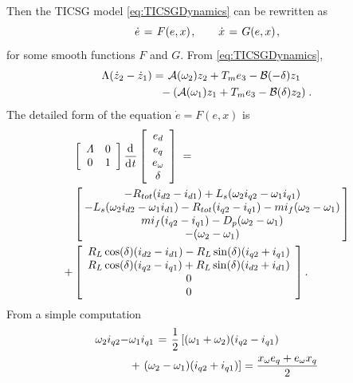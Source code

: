 \documentclass[letterpaper,10pt,conference]{ieeeconf}
\renewcommand{\L}    {{\Lambda}}
\renewcommand{\o}    {{\omega}}
\newcommand{\half}   {{\frac{1}{2}}}
\newcommand{\m}      {{\hbox{\hskip 1pt}}}
\newcommand{\nm}     {{\hbox{\hskip -3pt}}}
\newcommand{\dd}     {{\rm d\hbox{\hskip 0.5pt}}}
\newcommand{\Amscr}  {{\mathcal{A}}}
\newcommand{\Bmscr}  {{\mathcal{B}}}
\begin{document}
Then the TICSG model \eqref{eq:TICSGDynamics} can be rewritten as
\begin{equation} \label{eq:sync_sestem}
   \dot{e} \m=\m F(e,x) \m,\qquad \dot{x} \m=\m G(e,x) \m,
\end{equation}
for some smooth functions $F$ and $G$. From 
\eqref{eq:TICSGDynamics}, 
$$ \begin{aligned} \L(\dot{z}_2-\dot{z}_1) &=\m \Amscr(\o_2) z_2 + 
   T_m e_3-\Bmscr(-\delta)z_1\\ &\ \ -\left(\Amscr(\o_1)z_1+T_m 
   e_3-\Bmscr(\delta)z_2\right) \m.\end{aligned}$$
The detailed form of the equation $\dot e=F(e,x)$ is
$$ \begin{aligned} & \left[\begin{array}{cc} \varLambda & 0\\ 0 & 
   1 \end{array}\right] \frac{\dd}{\dd t}\left[\begin{array}{c}
   e_d\\ e_q\\ e_\o\\ \delta\end{array}\right] \m= \\ & \left[\nm
   \begin{array}{c} -R_{tot}(i_{d2}-i_{d1})+L_s(\o_2 i_{q2}-
   \o_1 i_{q1})\\ -L_s(\o_2 i_{d2}-\o_1 i_{d1})-R_{tot} (i_{q2}
   -i_{q1})-mi_f(\o_2-\o_1)\\ mi_f(i_{q2}-i_{q1})-D_p(\o_2-\o_1)
   \\ -(\o_2-\o_1) \end{array}\nm\right]\\ + & \left[\begin{array}
   {c} R_L\cos(\delta)(i_{d2}-i_{d1})-R_L\sin(\delta)(i_{q2}
   +i_{q1})\\ R_L\cos(\delta)(i_{q2}-i_{q1})+R_L\sin(\delta)(i_{d2}
   +i_{d1})\\ 0\\ 0 \end{array}\right]. \end{aligned}$$
From a simple computation \vspace{-2mm}
$$ \begin{aligned} \o_2 i_{q2} -& \o_1 i_{q1} \m=\m \half\left[
   (\o_1+\o_2)(i_{q2}-i_{q1}) \right.\\ &+ \left. (\o_2-\o_1)(i_{q2}
   +i_{q1})\right] = \frac{x_\o e_q+e_\o x_q}{2} \end{aligned}$$
\end{document}
